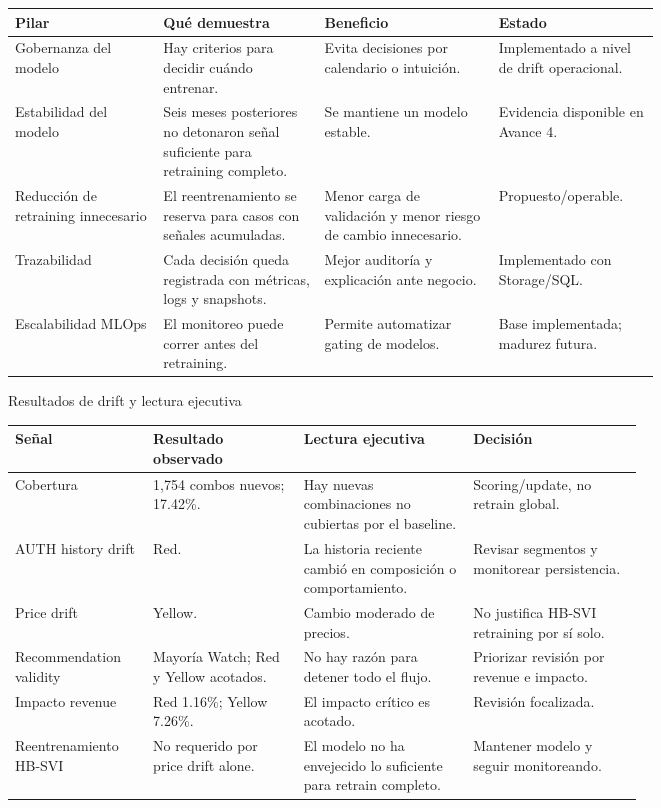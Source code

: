 \documentclass[11pt,letterpaper]{article}
\makeatletter
\renewcommand\section{\@startsection{section}{1}{\z@}
  {-3.5ex \@plus -1ex \@minus -.2ex}
  {2.3ex \@plus .2ex}
  {\Large\bfseries\sffamily\color{azulTec}}}
\makeatother
\begin{document}
\begin{tabularx}{\linewidth}{L{0.23\linewidth}L{0.25\linewidth}L{0.27\linewidth}Y}
\toprule
\textbf{Pilar} & \textbf{Qué demuestra} & \textbf{Beneficio} & \textbf{Estado} \\
\midrule
Gobernanza del modelo & Hay criterios para decidir cuándo entrenar. & Evita decisiones por calendario o intuición. & Implementado a nivel de drift operacional. \\
Estabilidad del modelo & Seis meses posteriores no detonaron señal suficiente para retraining completo. & Se mantiene un modelo estable. & Evidencia disponible en Avance 4. \\
Reducción de retraining innecesario & El reentrenamiento se reserva para casos con señales acumuladas. & Menor carga de validación y menor riesgo de cambio innecesario. & Propuesto/operable. \\
Trazabilidad & Cada decisión queda registrada con métricas, logs y snapshots. & Mejor auditoría y explicación ante negocio. & Implementado con Storage/SQL. \\
Escalabilidad MLOps & El monitoreo puede correr antes del retraining. & Permite automatizar gating de modelos. & Base implementada; madurez futura. \\
\bottomrule
\end{tabularx}

\section{Resultados de drift y lectura ejecutiva}

\begin{tabularx}{\linewidth}{L{0.22\linewidth}L{0.24\linewidth}L{0.27\linewidth}Y}
\toprule
\textbf{Señal} & \textbf{Resultado observado} & \textbf{Lectura ejecutiva} & \textbf{Decisión} \\
\midrule
Cobertura & 1,754 combos nuevos; 17.42\%. & Hay nuevas combinaciones no cubiertas por el baseline. & Scoring/update, no retrain global. \\
AUTH history drift & Red. & La historia reciente cambió en composición o comportamiento. & Revisar segmentos y monitorear persistencia. \\
Price drift & Yellow. & Cambio moderado de precios. & No justifica HB-SVI retraining por sí solo. \\
Recommendation validity & Mayoría Watch; Red y Yellow acotados. & No hay razón para detener todo el flujo. & Priorizar revisión por revenue e impacto. \\
Impacto revenue & Red 1.16\%; Yellow 7.26\%. & El impacto crítico es acotado. & Revisión focalizada. \\
Reentrenamiento HB-SVI & No requerido por price drift alone. & El modelo no ha envejecido lo suficiente para retrain completo. & Mantener modelo y seguir monitoreando. \\
\bottomrule
\end{tabularx}
\end{document}
